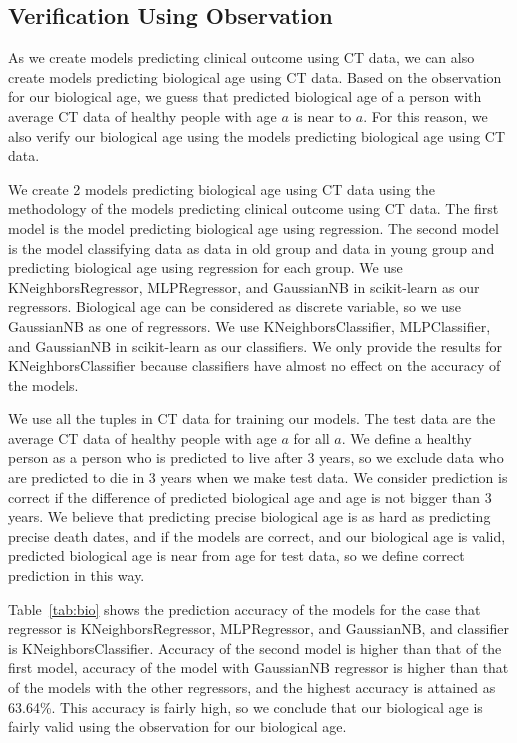 \subsection{Verification Using Observation}
As we create models predicting clinical outcome using CT data, we can also create models predicting biological age using CT data. Based on the observation for our biological age, we guess that predicted biological age of a person with average CT data of healthy people with age $a$ is near to $a$. For this reason, we also verify our biological age using the models predicting biological age using CT data.

We create 2 models predicting biological age using CT data using the methodology of the models predicting clinical outcome using CT data. The first model is the model predicting biological age using regression. The second model is the model classifying data as data in old group and data in young group and predicting biological age using regression for each group. We use KNeighborsRegressor, MLPRegressor, and GaussianNB in scikit-learn as our regressors. Biological age can be considered as discrete variable, so we use GaussianNB as one of regressors. We use KNeighborsClassifier, MLPClassifier, and GaussianNB in scikit-learn as our classifiers. We only provide the results for KNeighborsClassifier because classifiers have almost no effect on the accuracy of the models.

We use all the tuples in CT data for training our models. The test data are the average CT data of healthy people with age $a$ for all $a$. We define a healthy person as a person who is predicted to live after 3 years, so we exclude data who are predicted to die in 3 years when we make test data. We consider prediction is correct if the difference of predicted biological age and age is not bigger than 3 years. We believe that predicting precise biological age is as hard as predicting precise death dates, and if the models are correct, and our biological age is valid, predicted biological age is near from age for test data, so we define correct prediction in this way.

Table~\ref{tab:bio} shows the prediction accuracy of the models for the case that regressor is KNeighborsRegressor, MLPRegressor, and GaussianNB, and classifier is KNeighborsClassifier. Accuracy of the second model is higher than that of the first model, accuracy of the model with GaussianNB regressor is higher than that of the models with the other regressors, and the highest accuracy is attained as 63.64\%. This accuracy is fairly high, so we conclude that our biological age is fairly valid using the observation for our biological age.

